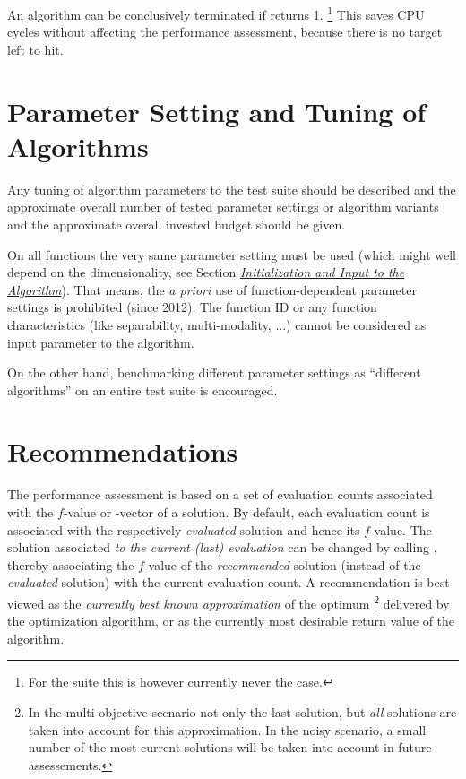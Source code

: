 \documentclass[letterpaper,12pt,english]{article}
\begin{document}
An algorithm can be conclusively terminated if
\href{http://numbbo.github.io/coco-doc/C/coco\_8h.html\#a1164d85fd641ca48046b943344ae9069}{} returns 1. \footnote[8]{
For the  suite this is however currently never the case.
} This saves CPU cycles without
affecting the performance assessment, because there is no target left to hit.


\section{Parameter Setting and Tuning of Algorithms}
\label{index:sec-tuning}\label{index:parameter-setting-and-tuning-of-algorithms}
Any tuning of algorithm parameters to the test suite should be described and
the approximate overall number of tested parameter settings or algorithm
variants and the approximate overall invested budget should be given.

On all functions the very same parameter setting must be used (which might
well depend on the dimensionality, see Section {\hyperref[index:sec\string-input]{\emph{Initialization and Input to the Algorithm}}}). That means,
the \emph{a priori} use of function-dependent parameter settings is prohibited
(since 2012).  The function ID or any function characteristics (like
separability, multi-modality, ...) cannot be considered as input parameter to
the algorithm.

On the other hand, benchmarking different parameter settings as ``different
algorithms'' on an entire test suite is encouraged.


\section{Recommendations}
\label{index:sec-recommendations}\label{index:recommendations}
The performance assessment is based on a set of evaluation counts
associated with the \(f\)-value or -vector of a solution.
By default, each evaluation count is associated with the respectively \emph{evaluated}
solution and hence its \(f\)-value.
The solution associated \emph{to the current (last) evaluation} can be changed by calling \href{http://numbbo.github.io/coco-doc/C/coco\_8h.html\#afd76a19eddd49fb78c22563390437df2}{}, thereby associating the \(f\)-value of the
\emph{recommended} solution (instead of the \emph{evaluated} solution) with the current evaluation count.
A recommendation is best viewed as the \emph{currently best known approximation} of the
optimum \footnote[9]{
In the multi-objective scenario not only the last solution, but \emph{all}
solutions are taken into account for this approximation.
In the noisy scenario, a small number of the most current solutions will be
taken into account in future assessements.
} delivered by the optimization algorithm, or as the currently most
desirable return value of the algorithm.
\end{document}
